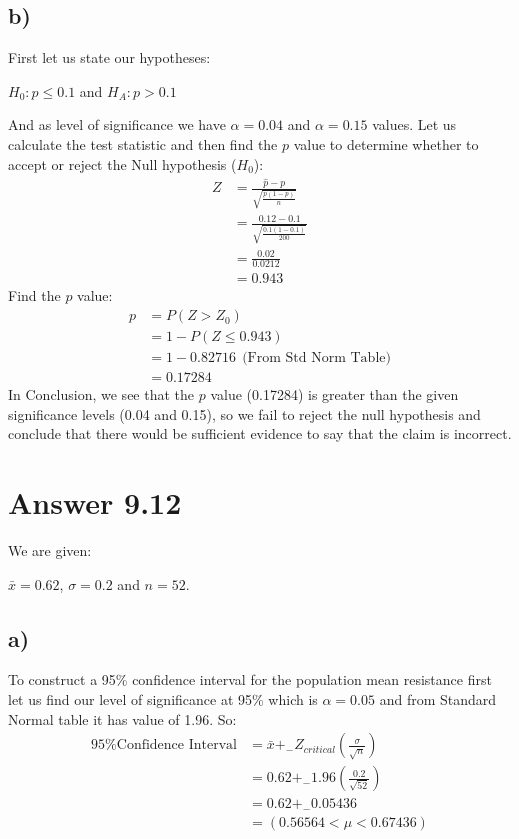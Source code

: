 \documentclass[12pt]{article}
\begin{document}
\subsection*{b)}
First let us state our hypotheses: \\
\begin{center}
$H_0:p\leq 0.1$ and $H_A:p > 0.1$ \\
\end{center}
And as level of significance we have $\alpha = 0.04$ and $\alpha = 0.15$ values. Let us calculate the test statistic and then find the $p$ value to determine whether to accept or reject the Null hypothesis ($H_0$):
\begin{align*}
Z &= \frac{\hat{p}-p}{\sqrt{\frac{p(1-p)}{n}}} \\
  &= \frac{0.12-0.1}{\sqrt{\frac{0.1(1-0.1)}{200}}} \\
  &= \frac{0.02}{0.0212} \\
  &= 0.943
\end{align*}
Find the $p$ value:
\begin{align*}
p &= P(Z > Z_0) \\
  &= 1 - P(Z \leq 0.943) \\
  &= 1 - 0.82716 \ \ \text{(From Std Norm Table)} \\
  &= 0.17284
\end{align*}
In Conclusion, we see that the $p$ value (0.17284) is greater than the given significance levels (0.04 and 0.15), so we fail to reject the null hypothesis and conclude that there would be sufficient evidence to say that the claim is incorrect.

\newpage
\section*{Answer 9.12}
We are given: \\
\begin{center}
$\bar{x} = 0.62$, $\sigma = 0.2$ and $n = 52$. 
\end{center}

\subsection*{a)}
To construct a 95\% confidence interval for the population mean resistance first let us find our level of significance at 95\% which is $\alpha = 0.05$ and from Standard Normal table it has value of 1.96.
So:
\begin{align*}
\text{95\% Confidence Interval} &= \bar{x} +_- Z_{critical}(\frac{\sigma}{\sqrt{n}}) \\
&= 0.62 +_- 1.96(\frac{0.2}{\sqrt{52}})\\
&= 0.62 +_- 0.05436 \\
&= (0.56564 < \mu < 0.67436)
\end{align*}
\end{document}
